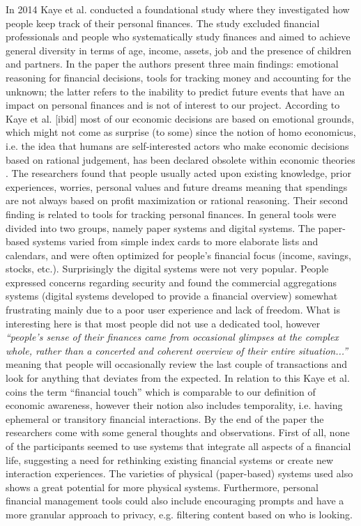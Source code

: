 In 2014 Kaye et al. \cite{kaye2014money} conducted a foundational study where they investigated how people keep track of their personal finances. The study excluded financial professionals and people who systematically study finances and aimed to achieve general diversity in terms of age, income, assets, job and the presence of children and partners. In the paper the authors present three main findings: emotional reasoning for financial decisions, tools for tracking money and accounting for the unknown; the latter refers to the inability to predict future events that have an impact on personal finances and is not of interest to our project. According to Kaye et al. [ibid] most of our economic decisions are based on emotional grounds, which might not come as surprise (to some) since the notion of homo economicus, i.e. the idea that humans are self-interested actors who make economic decisions based on rational judgement, has been declared obsolete within economic theories \cite{REFERENCE}. The researchers found that people usually acted upon existing knowledge, prior experiences, worries, personal values and future dreams meaning that spendings are not always based on profit maximization or rational reasoning.
Their second finding is related to tools for tracking personal finances. In general tools were divided into two groups, namely paper systems and digital systems. The paper-based systems varied from simple index cards to more elaborate lists and calendars, and were often optimized for people’s financial focus (income, savings, stocks, etc.). Surprisingly the digital systems were not very popular. People expressed concerns regarding security and found the commercial aggregations systems (digital systems developed to provide a financial overview) somewhat frustrating mainly due to a poor user experience and lack of freedom. What is interesting here is that most people did not use a dedicated tool, however \emph{“people’s sense of their finances came from occasional glimpses at the complex whole, rather than a concerted and coherent overview of their entire situation...”} \cite[p.~562]{kaye2014money} meaning that people will occasionally review the last couple of transactions and look for anything that deviates from the expected. In relation to this Kaye et al. coins the term “financial touch” which is comparable to our definition of economic awareness, however their notion also includes temporality, i.e. having ephemeral or transitory financial interactions.
By the end of the paper the researchers come with some general thoughts and observations. First of all, none of the participants seemed to use systems that integrate all aspects of a financial life, suggesting a need for rethinking existing financial systems or create new interaction experiences. The varieties of physical (paper-based) systems used also shows a great potential for more physical systems. Furthermore, personal financial management tools could also include encouraging prompts and have a more granular approach to privacy, e.g. filtering content based on who is looking.\\

